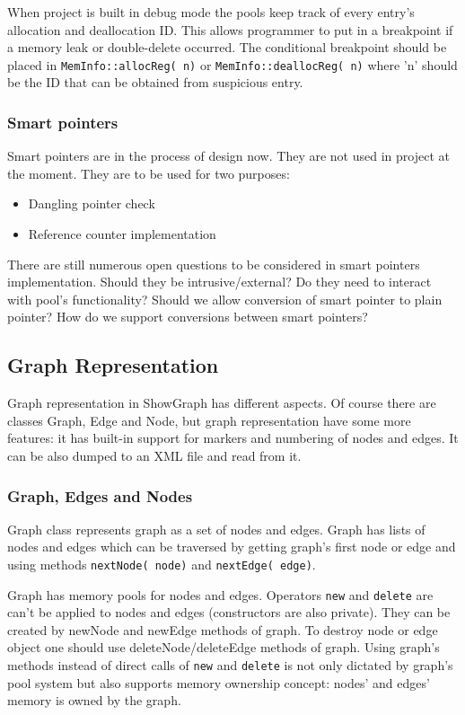 \documentclass[11pt,a4paper]{article}
\begin{document}
When project is built in debug mode the pools keep track of every entry's allocation and deallocation ID. This allows programmer to put in a breakpoint if a memory leak or double-delete occurred. The conditional breakpoint should be placed in \lstinline{MemInfo::allocReg( n)} or \lstinline{MemInfo::deallocReg( n)} where 'n' should be the ID that can be obtained from suspicious entry.

\subsubsection{Smart pointers}
Smart pointers are in the process of design now. They are not used in project at the moment. They are to be used for two purposes:
\begin{itemize}
\item Dangling pointer check
\item Reference counter implementation
\end{itemize}

There are still numerous open questions to be considered in smart pointers implementation. Should they be intrusive/external? Do they need to interact with pool's functionality? Should we allow conversion of smart pointer to plain pointer? How do we support conversions between smart pointers?

\subsection{Graph Representation}
Graph representation in ShowGraph has different aspects. Of course there are classes Graph, Edge and Node, but graph representation have some more features: it has built-in support for markers and numbering of nodes and edges. It can be also dumped to an XML file and read from it.

\subsubsection{Graph, Edges and Nodes}
Graph class represents graph as a set of nodes and edges. Graph has lists of nodes and edges which can be traversed by getting graph's first node or edge and using methods \lstinline{nextNode( node)} and \lstinline{nextEdge( edge)}. 

Graph has memory pools for nodes and edges. Operators \lstinline{new} and \lstinline{delete} are can't be applied to nodes and edges (constructors are also private).  They can be created by newNode and newEdge methods of graph. To destroy node or edge object one should use deleteNode/deleteEdge methods of graph. Using graph's methods instead of direct calls of \lstinline{new} and \lstinline{delete} is not only dictated by graph's pool system but also supports memory ownership concept: nodes' and edges' memory is owned by the graph.
\end{document}
